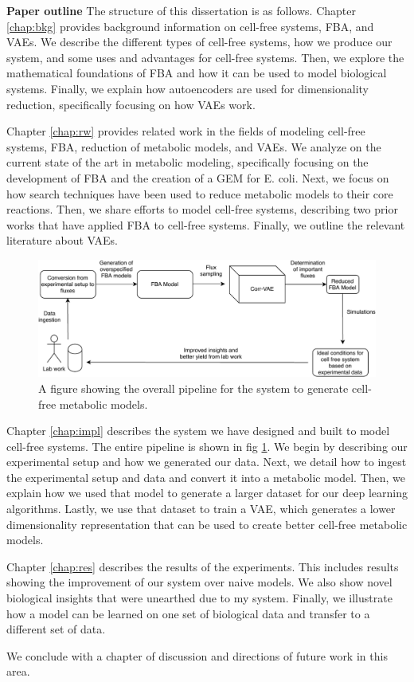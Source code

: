 \textbf{Paper outline}
The structure of this dissertation is as follows.
Chapter \ref{chap:bkg} provides background information on cell-free systems, FBA, and VAEs.
We describe the different types of cell-free systems, how we produce our system, and some uses and advantages for cell-free systems.
Then, we explore the mathematical foundations of FBA and how it can be used to model biological systems.
Finally, we explain how autoencoders are used for dimensionality reduction, specifically focusing on how VAEs work.

Chapter \ref{chap:rw} provides related work in the fields of modeling cell-free systems, FBA, reduction of metabolic models, and VAEs.
We analyze on the current state of the art in metabolic modeling, specifically focusing on the development of FBA and the creation of a GEM for E. coli.
Next, we focus on how search techniques have been used to reduce metabolic models to their core reactions.
Then, we share efforts to model cell-free systems, describing two prior works that have applied FBA to cell-free systems.
Finally, we outline the relevant literature about VAEs.

\begin{figure}[t!]
\begin{center}
\includegraphics[width=\textwidth]{figs/SystemOverview.pdf}
\end{center}
\label{fig:overview}
\caption{A figure showing the overall pipeline for the system to generate cell-free metabolic models.}
\end{figure}

Chapter \ref{chap:impl} describes the system we have designed and built to model cell-free systems.
The entire pipeline is shown in fig \ref{fig:overview}.
We begin by describing our experimental setup and how we generated our data.
Next, we detail how to ingest the experimental setup and data and convert it into a metabolic model.
Then, we explain how we used that model to generate a larger dataset for our deep learning algorithms.
Lastly, we use that dataset to train a VAE, which generates a lower dimensionality representation that can be used to create better cell-free metabolic models.

Chapter \ref{chap:res} describes the results of the experiments.
This includes results showing the improvement of our system over naive models.
We also show novel biological insights that were unearthed due to my system.
Finally, we illustrate how a model can be learned on one set of biological data and transfer to a different set of data. 

We conclude with a chapter of discussion and directions of future work in this area.
